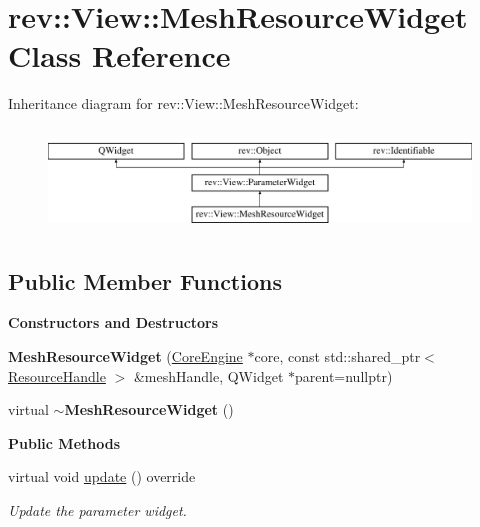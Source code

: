 \hypertarget{classrev_1_1_view_1_1_mesh_resource_widget}{}\section{rev\+::View\+::Mesh\+Resource\+Widget Class Reference}
\label{classrev_1_1_view_1_1_mesh_resource_widget}
Inheritance diagram for rev\+::View\+::Mesh\+Resource\+Widget\+:\begin{figure}[H]
\begin{center}
\leavevmode
\includegraphics[height=2.772277cm]{classrev_1_1_view_1_1_mesh_resource_widget}
\end{center}
\end{figure}
\subsection*{Public Member Functions}
\begin{Indent}\textbf{ Constructors and Destructors}\par
\begin{DoxyCompactItemize}
\item 
\mbox{\label{classrev_1_1_view_1_1_mesh_resource_widget_ac85dae1f0ceb4ab553f08bb0ae82d432}} 
{\bfseries Mesh\+Resource\+Widget} (\mbox{\hyperlink{classrev_1_1_core_engine}{Core\+Engine}} $\ast$core, const std\+::shared\+\_\+ptr$<$ \mbox{\hyperlink{classrev_1_1_resource_handle}{Resource\+Handle}} $>$ \&mesh\+Handle, Q\+Widget $\ast$parent=nullptr)
\item 
\mbox{\label{classrev_1_1_view_1_1_mesh_resource_widget_ab4f79ac4a175adb289e96fa98132dac4}} 
virtual {\bfseries $\sim$\+Mesh\+Resource\+Widget} ()
\end{DoxyCompactItemize}
\end{Indent}
\begin{Indent}\textbf{ Public Methods}\par
\begin{DoxyCompactItemize}
\item 
\mbox{\label{classrev_1_1_view_1_1_mesh_resource_widget_a72228fba46e9cb2b39c00bc4ba680cfe}} 
virtual void \mbox{\hyperlink{classrev_1_1_view_1_1_mesh_resource_widget_a72228fba46e9cb2b39c00bc4ba680cfe}{update}} () override
\begin{DoxyCompactList}\small\item\em Update the parameter widget. \end{DoxyCompactList}\end{DoxyCompactItemize}
\end{Indent}
